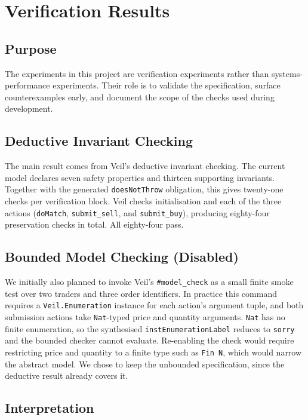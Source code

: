 \section{Verification Results}

\subsection{Purpose}

The experiments in this project are verification experiments rather than
systems-performance experiments. Their role is to validate the specification,
surface counterexamples early, and document the scope of the checks used
during development.

\subsection{Deductive Invariant Checking}

The main result comes from Veil's deductive invariant checking. The current
model declares seven safety properties and thirteen supporting invariants.
Together with the generated \texttt{doesNotThrow} obligation, this gives
twenty-one checks per verification block. Veil checks initialisation and each
of the three actions (\texttt{doMatch}, \texttt{submit\_sell}, and
\texttt{submit\_buy}), producing eighty-four preservation checks in total. All
eighty-four pass.

\subsection{Bounded Model Checking (Disabled)}

We initially also planned to invoke Veil's \texttt{\#model\_check} as a small
finite smoke test over two traders and three order identifiers. In practice
this command requires a \texttt{Veil.Enumeration} instance for each action's
argument tuple, and both submission actions take \texttt{Nat}-typed price and
quantity arguments. \texttt{Nat} has no finite enumeration, so the synthesised
\texttt{instEnumerationLabel} reduces to \texttt{sorry} and the bounded
checker cannot evaluate. Re-enabling the check would require restricting price
and quantity to a finite type such as \texttt{Fin~N}, which would narrow the
abstract model. We chose to keep the unbounded specification, since the
deductive result already covers it.

\subsection{Interpretation}

